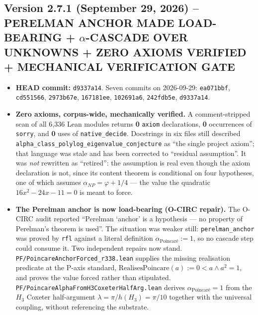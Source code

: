 \subsection*{Version 2.7.1 (September 29, 2026) -- PERELMAN ANCHOR MADE LOAD-BEARING + $\alpha$-CASCADE OVER UNKNOWNS + ZERO AXIOMS VERIFIED + MECHANICAL VERIFICATION GATE}
\begin{itemize}

\item \textbf{HEAD commit:} \texttt{d9337a14}. Seven commits on
2026-09-29: \texttt{ea071bbf}, \texttt{cd551566}, \texttt{2973b67e},
\texttt{167181ee}, \texttt{102691a6}, \texttt{242fdb5e},
\texttt{d9337a14}.

\item \textbf{Zero axioms, corpus-wide, mechanically verified.} A
comment-stripped scan of all 6{,}336 Lean modules returns \textbf{0}
\texttt{axiom} declarations, \textbf{0} occurrences of \texttt{sorry},
and \textbf{0} uses of \texttt{native\_decide}. Docstrings in six files
still described
\texttt{alpha\_class\_polylog\_eigenvalue\_conjecture} as ``the single
project axiom''; that language was stale and has been corrected to
``residual assumption''. It was \emph{not} rewritten as ``retired'':
the assumption is real even though the axiom declaration is not, since
its content theorem is conditional on four hypotheses, one of which
assumes $\alpha_{NP} = \varphi + 1/4$ --- the value the quadratic
$16x^{2} - 24x - 11 = 0$ is meant to force.

\item \textbf{The Perelman anchor is now load-bearing (O-CIRC repair).}
The O-CIRC audit reported ``Perelman `anchor' is a hypothesis --- no
property of Perelman's theorem is used''. The situation was weaker
still: \texttt{perelman\_anchor} was proved by \texttt{rfl} against a
literal definition $\alpha_{\text{Poincar\'e}} := 1$, so no cascade step
could consume it. Two independent repairs now stand.
\texttt{PF/PoincareAnchorForced\_r338.lean} supplies the missing
realisation predicate at the P-axis standard,
$\mathrm{RealisesPoincare}(a) := 0 < a \wedge a^{2} = 1$, and proves the
value forced rather than stipulated.
\texttt{PF/PoincareAlphaFromH3CoxeterHalfArg.lean} derives
$\alpha_{\text{Poincar\'e}} = 1$ from the $H_3$ Coxeter half-argument
$\lambda = \pi/h(H_3) = \pi/10$ together with the universal coupling,
without referencing the substrate.


\end{itemize}
